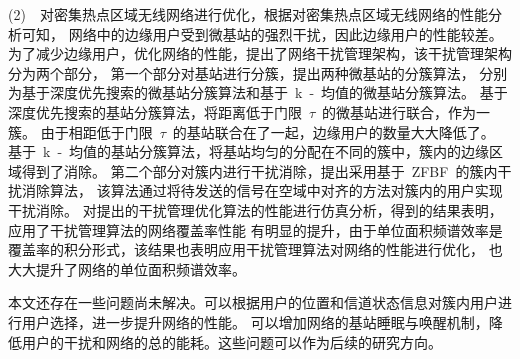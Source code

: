 (2)~~对密集热点区域无线网络进行优化，根据对密集热点区域无线网络的性能分析可知，
网络中的边缘用户受到微基站的强烈干扰，因此边缘用户的性能较差。
为了减少边缘用户，优化网络的性能，提出了网络干扰管理架构，该干扰管理架构分为两个部分，
第一个部分对基站进行分簇，提出两种微基站的分簇算法，
分别为基于深度优先搜索的微基站分簇算法和基于~k~-~均值的微基站分簇算法。
基于深度优先搜索的基站分簇算法，将距离低于门限~$\tau$~的微基站进行联合，作为一簇。
由于相距低于门限~$\tau$~的基站联合在了一起，边缘用户的数量大大降低了。
基于~k~-~均值的基站分簇算法，将基站均匀的分配在不同的簇中，簇内的边缘区域得到了消除。
第二个部分对簇内进行干扰消除，提出采用基于~ZFBF~的簇内干扰消除算法，
该算法通过将待发送的信号在空域中对齐的方法对簇内的用户实现干扰消除。
对提出的干扰管理优化算法的性能进行仿真分析，得到的结果表明，应用了干扰管理算法的网络覆盖率性能
有明显的提升，由于单位面积频谱效率是覆盖率的积分形式，该结果也表明应用干扰管理算法对网络的性能进行优化，
也大大提升了网络的单位面积频谱效率。

本文还存在一些问题尚未解决。可以根据用户的位置和信道状态信息对簇内用户进行用户选择，进一步提升网络的性能。
可以增加网络的基站睡眠与唤醒机制，降低用户的干扰和网络的总的能耗。这些问题可以作为后续的研究方向。
